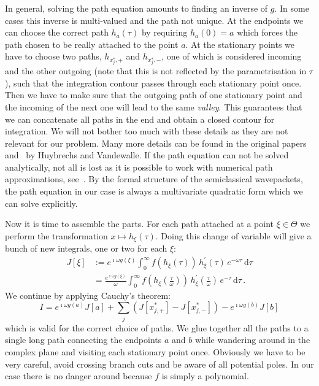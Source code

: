 \documentclass[a4paper,10pt]{article}
\begin{document}
In general, solving the path equation amounts to finding an inverse of $g$. In some cases
this inverse is multi-valued and the path not unique. At the endpoints we can
choose the correct path $h_a(\tau)$ by requiring $h_a(0) = a$ which forces the
path chosen to be really attached to the point $a$. At the stationary points we have
to choose two paths, $h_{x^{*}_j,+}$ and $h_{x^{*}_j,-}$, one of which is considered
incoming and the other outgoing (note that this is not reflected by the parametrisation
in $\tau$), such that the integration contour passes through each stationary point once.
Then we have to make sure that the outgoing path of one stationary point
and the incoming of the next one will lead to the same \emph{valley}. This guarantees
that we can concatenate all paths in the end and obtain a closed contour for integration.
We will not bother too much with these details as they are not relevant for our problem.
Many more details can be found in the original papers~\cite{HV_hoq} and~\cite{HV_cub} by
Huybrechs and Vandewalle. If the path equation can not be solved analytically, not
all is lost as it is possible to work with numerical path approximations, see~\cite{AH_nsd_pa}.
By the formal structure of the semiclassical wavepackets, the path equation in our case is always
a multivariate quadratic form which we can solve explicitly.

Now it is time to assemble the parts. For each path attached at a point $\xi \in \Theta$
we perform the transformation $x \mapsto h_{\xi}(\tau)$. Doing this change of variable
will give a bunch of new integrals, one or two for each $\xi$:
\begin{equation}\label{eq:single_path_integral}
\begin{split}
  J[\xi] & := e^{\imath \omega g(\xi)}
              \int_{0}^{\infty}
                f(h_{\xi}(\tau)) \,
                h_{\xi}^{\prime}(\tau) \,
                e^{-\omega \tau} \,
              \mathrm{d}\tau \\
         & = \frac{e^{\imath \omega g(\xi)}}{\omega}
              \int_{0}^{\infty}
                f\left(h_{\xi}\left(\frac{\tau}{\omega}\right)\right) \,
                h_{\xi}^{\prime}\left(\frac{\tau}{\omega}\right) \,
                e^{-\tau} \,
              \mathrm{d}\tau \,.
\end{split}
\end{equation}
We continue by applying Cauchy's theorem:
\begin{equation}\label{eq:cauchy}
      I = e^{\imath \omega g(a)} J[a]
        + \sum_{j} \left(J[x_{j,+}^{*}] - J[x_{j,-}^{*}]\right)
        - e^{\imath \omega g(b)} J[b]
\end{equation}
which is valid for the correct choice of paths. We glue together all the paths
to a single long path connecting the endpoints $a$ and $b$ while wandering around
in the complex plane and visiting each stationary point once. Obviously we have to
be very careful, avoid crossing branch cuts and be aware of all potential poles.
In our case there is no danger around because $f$ is simply a polynomial.
\end{document}
